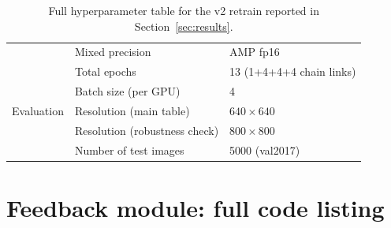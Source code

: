 \begin{table}[H]
\begin{tabular}{lll}
    & Mixed precision & AMP fp16 \\
    & Total epochs & 13 (1+4+4+4 chain links) \\
    & Batch size (per GPU) & 4 \\
    \midrule
    Evaluation & Resolution (main table) & $640 \times 640$ \\
    & Resolution (robustness check) & $800 \times 800$ \\
    & Number of test images & 5000 (val2017) \\
    \bottomrule
\end{tabular}
\caption{Full hyperparameter table for the v2 retrain reported in Section~\ref{sec:results}.}
\label{tab:hyper}
\end{table}

\section{Feedback module: full code listing}
\label{app:code}

